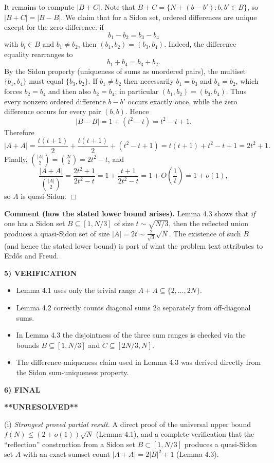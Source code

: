 It remains to compute $|B+C|$.
Note that $B+C = \{N + (b-b'): b,b'\in B\}$, so $|B+C| = |B-B|$.
We claim that for a Sidon set, ordered differences are unique except for the zero difference:
if
\[
b_1-b_2=b_3-b_4
\]
with $b_i\in B$ and $b_1\ne b_2$, then $(b_1,b_2)=(b_3,b_4)$.
Indeed, the difference equality rearranges to
\[
b_1+b_4 = b_3+b_2.
\]
By the Sidon property (uniqueness of sums as unordered pairs), the multiset $\{b_1,b_4\}$ must equal $\{b_3,b_2\}$.
If $b_1\ne b_2$ then necessarily $b_1=b_3$ and $b_4=b_2$, which forces $b_2=b_4$ and then also $b_2=b_4$; in particular $(b_1,b_2)=(b_3,b_4)$.
Thus every nonzero ordered difference $b-b'$ occurs exactly once, while the zero difference occurs for every pair $(b,b)$.
Hence
\[
|B-B| = 1 + (t^2-t) = t^2-t+1.
\]
Therefore
\[
|A+A| = \frac{t(t+1)}{2}+\frac{t(t+1)}{2}+(t^2-t+1) = t(t+1)+t^2-t+1 = 2t^2+1.
\]
Finally, $\binom{|A|}{2}=\binom{2t}{2}=2t^2-t$, and
\[
\frac{|A+A|}{\binom{|A|}{2}} = \frac{2t^2+1}{2t^2-t} = 1 + \frac{t+1}{2t^2-t} = 1+O\left(\frac{1}{t}\right)=1+o(1),
\]
so $A$ is quasi-Sidon.
\hfill$\Box$

\medskip
\noindent\textbf{Comment (how the stated lower bound arises).}
Lemma 4.3 shows that 
\emph{if} one has a Sidon set $B\subseteq[1,N/3]$ of size $t\sim \sqrt{N/3}$, then the reflected union produces a quasi-Sidon set of size $|A|=2t\sim \frac{2}{\sqrt3}\sqrt N$.
The existence of such $B$ (and hence the stated lower bound) is part of what the problem text attributes to Erd\H{o}s and Freud.

\medskip
\noindent\textbf{5) VERIFICATION}

\begin{itemize}
\item Lemma 4.1 uses only the trivial range $A+A\subseteq\{2,\dots,2N\}$.
\item Lemma 4.2 correctly counts diagonal sums $2a$ separately from off-diagonal sums.
\item In Lemma 4.3 the disjointness of the three sum ranges is checked via the bounds $B\subseteq[1,N/3]$ and $C\subseteq[2N/3,N]$.
\item The difference-uniqueness claim used in Lemma 4.3 was derived directly from the Sidon sum-uniqueness property.
\end{itemize}

\medskip
\noindent\textbf{6) FINAL}

\textbf{**UNRESOLVED**}

(i) \emph{Strongest proved partial result.} A direct proof of the universal upper bound $f(N)\le (2+o(1))\sqrt N$ (Lemma 4.1), and a complete verification that the ``reflection'' construction from a Sidon set $B\subset[1,N/3]$ produces a quasi-Sidon set $A$ with an exact sumset count $|A+A|=2|B|^2+1$ (Lemma 4.3).

